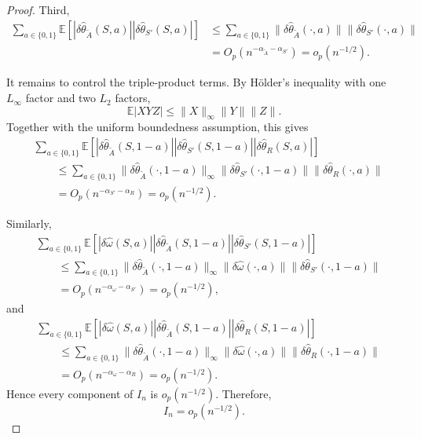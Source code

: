 \documentclass[12pt]{article}
\newcommand{\0}{\boldsymbol{0}}
\newcommand{\E}{\mathbb{E}}
\begin{document}
\begin{proof}
Third,
\[
\begin{aligned}
\sum_{a\in\{0,1\}} \E\left[
|\delta\widehat\theta_{\widetilde A}(S,a)|
|\delta\widehat\theta_{S'}(S,a)| \right]
&\leq \sum_{a\in\{0,1\}}
\|\delta\widehat\theta_{\widetilde A}(\cdot,a)\|
\|\delta\widehat\theta_{S'}(\cdot,a)\| \\
&= O_p(n^{-\alpha_{\widetilde A}-\alpha_{S'}})=o_p(n^{-1/2}).
\end{aligned}
\]

It remains to control the triple-product terms. By Hölder's inequality with one \(L_\infty\) factor and two \(L_2\) factors,
\[
\mathbb E|XYZ|\leq\|X\|_\infty \|Y\| \|Z\|.
\]
Together with the uniform boundedness assumption, this gives
\[
\begin{aligned}
&\sum_{a\in\{0,1\}}\E \left[
|\delta\widehat\theta_{\widetilde A}(S,1-a)|
|\delta\widehat\theta_{S'}(S,1-a)|
|\delta\widehat\theta_R(S,a)| \right] \\
&\qquad\leq\sum_{a\in\{0,1\}}
\|\delta\widehat\theta_{\widetilde A}(\cdot,1-a)\|_\infty
\|\delta\widehat\theta_{S'}(\cdot,1-a)\|
\|\delta\widehat\theta_R(\cdot,a)\| \\
&\qquad=O_p(n^{-\alpha_{S'}-\alpha_R})=o_p(n^{-1/2}).
\end{aligned}
\]

Similarly,
\[
\begin{aligned}
&\sum_{a\in\{0,1\}}\mathbb E\!\left[
|\delta\widehat\omega(S,a)|
|\delta\widehat\theta_{\widetilde A}(S,1-a)|
|\delta\widehat\theta_{S'}(S,1-a)| \right] \\
&\qquad\leq\sum_{a\in\{0,1\}}
\|\delta\widehat\theta_{\widetilde A}(\cdot,1-a)\|_\infty
\|\delta\widehat\omega(\cdot,a)\|
\|\delta\widehat\theta_{S'}(\cdot,1-a)\| \\
&\qquad=O_p(n^{-\alpha_\omega-\alpha_{S'}})=o_p(n^{-1/2}),
\end{aligned}
\]
and
\[
\begin{aligned}
&\sum_{a\in\{0,1\}}\mathbb E\!\left[
|\delta\widehat\omega(S,a)|
|\delta\widehat\theta_{\widetilde A}(S,1-a)|
|\delta\widehat\theta_R(S,1-a)| \right] \\
&\qquad\leq\sum_{a\in\{0,1\}}
\|\delta\widehat\theta_{\widetilde A}(\cdot,1-a)\|_\infty
\|\delta\widehat\omega(\cdot,a)\|
\|\delta\widehat\theta_R(\cdot,1-a)\| \\
&\qquad=O_p(n^{-\alpha_\omega-\alpha_R})=o_p(n^{-1/2}).
\end{aligned}
\]
Hence every component of \(I_n\) is \(o_p(n^{-1/2})\). Therefore,
\[
I_n=o_p(n^{-1/2}).
\]


\end{proof}
\end{document}
